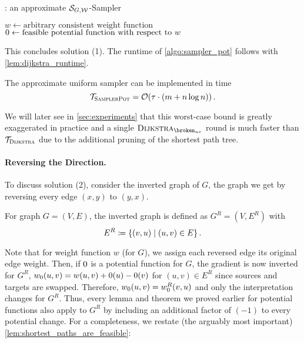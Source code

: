 \begin{algorithm}[!htb]
  \caption{
    \algsp: an approximate $\mathcal{S}_{G, \mathcal W}$-Sampler  
  }
  \label{algo:sampler_pot}


  \BlankLine
  $w \gets \text{arbitrary consistent weight function}$\;
  $\pot \gets \text{feasible potential function with respect to $w$}$\;
  \;
\end{algorithm}

This concludes solution (1).
The runtime of \cref{algo:sampler_pot} follows with \cref{lem:dijkstra_runtime}.

\begin{corollary}\label{cor:sampler_pot_runtime}
  The approximate uniform sampler can be implemented in time \[
    \mathcal{T}_{\textsc{SamplerPot}} = \mathcal O\!\left(\tau \cdot \left(m + n\log n\right)\right).
  \]
\end{corollary}

We will later see in \cref{sec:experiments} that this worst-case bound is greatly exaggerated in practice and a single $\algdk_{\brokuv}$ round is much faster than $\mathcal{T}_{\textsc{Dijkstra}}$ due to the additional pruning of the shortest path tree.

\paragraph{Reversing the Direction.}
To discuss solution (2), consider the inverted graph of $G$, \ie the graph we get by reversing every edge $(x, y)$ to $(y, x)$.

\begin{definition}
  For graph $G = (V, E)$, the inverted graph is defined as $G^R = (V, E^R)$ with \[
    E^R \coloneqq \left\{(v, u) \mid (u, v) \in E\right\}.
  \] 
\end{definition}

\noindent Note that for weight function $w$ (for $G$), we assign each reversed edge its original edge weight.
Then, if $\pot$ is a potential function for $G$, the gradient is now inverted for $G^R$, \ie $\wpot(u, v) = w(u, v) + \pot(u) - \pot(v)$ for $(u, v) \in E^R$ since sources and targets are swapped.
Therefore, $\wpot(u, v) = \wpot^R(v, u)$ and only the interpretation changes for $G^R$.
Thus, every lemma and theorem we proved earlier for potential functions also apply to $G^R$ by including an additional factor of $(-1)$ to every potential change.
For a completeness, we restate (the arguably most important) \cref{lem:shortest_paths_are_feasible}:

